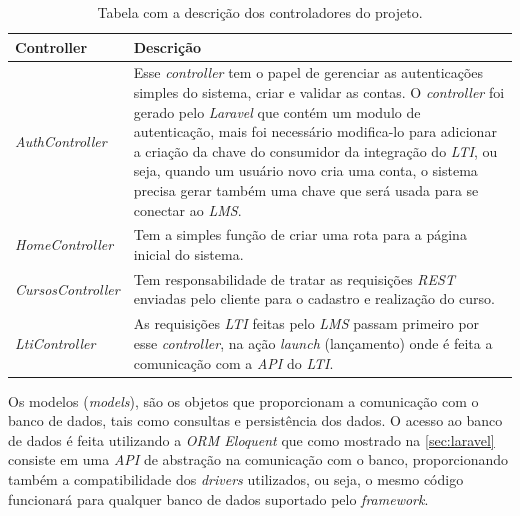 \begin{table}[htp]
\begin{tabular}{|p{}|p{}|}
    \hline \textbf{Controller}        & \textbf{Descrição} \\
    \hline \textit{AuthController}    &
        Esse \textit{controller} tem o papel de gerenciar as autenticações simples do sistema, criar e validar as contas. O \textit{controller} foi gerado pelo \textit{Laravel} que contém um modulo de autenticação, mais foi necessário modifica-lo para adicionar a criação da chave do consumidor da integração do \textit{LTI}, ou seja, quando um usuário novo cria uma conta, o sistema precisa gerar também uma chave que será usada para se conectar ao \textit{LMS}.
                                     \\
    \hline \textit{HomeController}    &
        Tem a simples função de criar uma rota para a página inicial do sistema.
                                     \\
    \hline \textit{CursosController}  &
        Tem responsabilidade de tratar as requisições \textit{REST} enviadas pelo cliente para o cadastro e realização do curso.
                                     \\
    \hline \textit{LtiController}     &
        As requisições \textit{LTI} feitas pelo \textit{LMS} passam primeiro por esse \textit{controller}, na ação \textit{launch} (lançamento) onde é feita a comunicação com a \textit{API} do \textit{LTI}.
                                     \\
    \hline 
    \end{tabular} 
    \caption{Tabela com a descrição dos controladores do projeto.}
    \label{tbl:controllers}
\end{table}

Os modelos (\textit{models}), são os objetos que proporcionam a comunicação com o banco de dados, tais como consultas e persistência dos dados. O acesso ao banco de dados é feita utilizando a \textit{ORM Eloquent} que como mostrado na \autoref{sec:laravel} consiste em uma \textit{API} de abstração na comunicação com o banco, proporcionando também a compatibilidade dos \textit{drivers} utilizados, ou seja, o mesmo código funcionará para qualquer banco de dados suportado pelo \textit{framework}.

